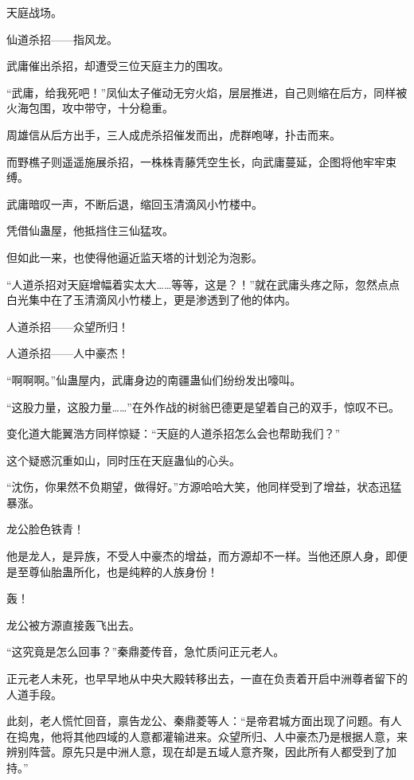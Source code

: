 
\begin{this_body}

天庭战场。

仙道杀招——指风龙。

武庸催出杀招，却遭受三位天庭主力的围攻。

“武庸，给我死吧！”凤仙太子催动无穷火焰，层层推进，自己则缩在后方，同样被火海包围，攻中带守，十分稳重。

周雄信从后方出手，三人成虎杀招催发而出，虎群咆哮，扑击而来。

而野樵子则遥遥施展杀招，一株株青藤凭空生长，向武庸蔓延，企图将他牢牢束缚。

武庸暗叹一声，不断后退，缩回玉清滴风小竹楼中。

凭借仙蛊屋，他抵挡住三仙猛攻。

但如此一来，也使得他逼近监天塔的计划沦为泡影。

“人道杀招对天庭增幅着实太大……等等，这是？！”就在武庸头疼之际，忽然点点白光集中在了玉清滴风小竹楼上，更是渗透到了他的体内。

人道杀招——众望所归！

人道杀招——人中豪杰！

“啊啊啊。”仙蛊屋内，武庸身边的南疆蛊仙们纷纷发出嚎叫。

“这股力量，这股力量……”在外作战的树翁巴德更是望着自己的双手，惊叹不已。

变化道大能翼浩方同样惊疑：“天庭的人道杀招怎么会也帮助我们？”

这个疑惑沉重如山，同时压在天庭蛊仙的心头。

“沈伤，你果然不负期望，做得好。”方源哈哈大笑，他同样受到了增益，状态迅猛暴涨。

龙公脸色铁青！

他是龙人，是异族，不受人中豪杰的增益，而方源却不一样。当他还原人身，即便是至尊仙胎蛊所化，也是纯粹的人族身份！

轰！

龙公被方源直接轰飞出去。

“这究竟是怎么回事？”秦鼎菱传音，急忙质问正元老人。

正元老人未死，也早早地从中央大殿转移出去，一直在负责着开启中洲尊者留下的人道手段。

此刻，老人慌忙回音，禀告龙公、秦鼎菱等人：“是帝君城方面出现了问题。有人在捣鬼，他将其他四域的人意都灌输进来。众望所归、人中豪杰乃是根据人意，来辨别阵营。原先只是中洲人意，现在却是五域人意齐聚，因此所有人都受到了加持。”


\end{this_body}
